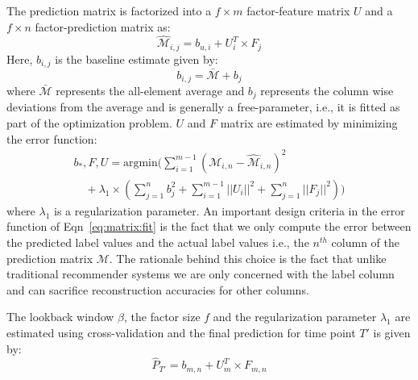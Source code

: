 The prediction matrix is factorized into a $f\times m$ factor-feature matrix $U$ and 
a $f\times n$ factor-prediction matrix as:
\[ \widehat{\mathcal{M}}_{i,j} = b_{u,i} + U^T_i \times F_j\]
Here, $b_{i,j}$ is the baseline estimate given by:
\vspace{-1em}
 \begin{equation}
   \label{eq:baseline}
   b_{i,j} = \bar{\mathcal{M}} + b_j 
 \end{equation}
 where $\bar{\mathcal{M}}$ represents the all-element average and $b_j$ represents 
 the column wise deviations from the average and is generally a free-parameter, i.e.,
it is fitted as part of the optimization problem.
$U$ and $F$ matrix are estimated by minimizing the error function:
\vspace{-1.0em}
\begin{equation}
  \begin{array}{l}
  \label{eq:matrix:fit}
  b_*, F, U   =  \textrm{argmin} (\sum \limits_{i=1}^{m-1} \left(\mathcal{M}_{i,n}  - \widehat{\mathcal{M}}_{i,n} \right)^2 \\ 
  \quad + \lambda_1\times(\sum \limits_{j=1}^{n}b_j^2 + \sum \limits_{i=1}^{m-1} || U_i||^2 + \sum \limits_{j=1}^{n} || F_j||^2))
\end{array}
\end{equation}
\noindent
where $\lambda_1$ is a regularization parameter. An important design criteria in
the error function of Eqn~\ref{eq:matrix:fit} is the fact that we only compute the error
between the predicted label values and the actual label values i.e., the $n^{th}$ column of the prediction 
matrix $\mathcal{M}$. The rationale behind this choice is the fact that unlike traditional recommender 
systems we are only concerned with the label column and can sacrifice reconstruction accuracies for other 
columns. 

The lookback window $\beta$, the factor size $f$ and the regularization parameter $\lambda_1$ 
are estimated using cross-validation
and the final prediction for time point $T'$ is given by:
\[\widehat{P}_{T'} = b_{m,n} + U_m^T \times F_{m,n} \]
\vspace{-1em}
